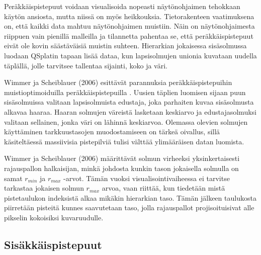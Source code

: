 Peräkkäispistepuut voidaan visualisoida nopeasti näytönohjaimen tehokkaan käytön ansiosta, mutta niissä on myös heikkouksia. Tietorakenteen vaatimuksena on, että kaikki data mahtuu näytönohjaimen muistiin. Näin on näytönohjaimesta riippuen vain pienillä malleilla ja tilannetta pahentaa se, että peräkkäispistepuut eivät ole kovin säästäväisiä muistin suhteen. Hierarkian jokaisessa sisäsolmussa luodaan QSplatin tapaan lisää dataa, kun lapsisolmujen unionia kuvataan uudella täplällä, jolle tarvitsee tallentaa sijainti, koko ja väri.

Wimmer ja Scheiblauer (2006) esittävät parannuksia peräkkäispistepuihin muistioptimoiduilla peräkkäispistepuilla . Uusien täplien luomisen sijaan puun sisäsolmuissa valitaan lapsisolmuista edustaja, joka parhaiten kuvaa sisäsolmusta alkavaa haaraa. Haaran solmujen väreistä lasketaan keskiarvo ja edustajasolmuksi valitaan sellainen, jonka väri on lähinnä keskiarvoa. Olemassa olevien solmujen käyttäminen tarkkuustasojen muodostamiseen on tärkeä oivallus, sillä käsiteltäessä massiivisia pistepilviä tulisi välttää ylimääräisen datan luomista. \cite{ip}

Wimmer ja Scheiblauer (2006) määrittävät solmun virheeksi yksinkertaisesti rajauspallon halkaisijan, minkä johdosta kunkin tason jokaisella solmulla on samat $r_{min}$ ja $r_{max}$ -arvot. Tämän vuoksi visualisointivaiheessa ei tarvitse tarkastaa jokaisen solmun $r_{max}$ arvoa, vaan riittää, kun tiedetään mistä pistetaulukon indeksistä alkaa mikäkin hierarkian taso. Tämän jälkeen taulukosta piirretään pisteitä kunnes saavutetaan taso, jolla rajauspallot projisoituisivat alle pikselin kokoisiksi kuvaruudulle. \cite{ip}



\subsection{Sisäkkäispistepuut}\label{sisäkkäis}

